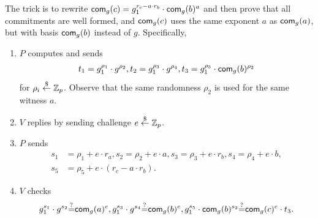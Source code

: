 {\begin{itemize}
  The trick is to rewrite
  $\mathsf{com}_g(c)=g_1^{r_c-a\cdot{}r_b}\cdot\mathsf{com}_g(b)^{a}$ and then prove
  that all commitments are well formed, and $\mathsf{com}_g(c)$ uses the same
  exponent $a$ as $\mathsf{com}_g(a)$, but with basis $\mathsf{com}_g(b)$ instead of
  $g$. Specifically,
  \begin{enumerate}
  \item $P$ computes and sends
    \begin{align*}
      t_1=g_1^{\rho_1}\cdot{}g^{\rho_2},
      t_2=g_1^{\rho_3}\cdot{}g^{\rho_4},
      t_3=g_1^{\rho_5}\cdot{}\mathsf{com}_g(b)^{\rho_2}
      \end{align*}
      for $\rho_i\stackrel{\$}{\leftarrow}\mathbb{Z}_p$. Observe that the same randomness $\rho_2$
      is used for the same witness $a$.
    \item $V$ replies by sending challenge $e\stackrel{\$}{\leftarrow}\mathbb{Z}_p$.
    \item $P$ sends
      \begin{align*}
        s_1&=\rho_1+e\cdot{}r_a,s_2=\rho_2+e\cdot{}a,s_3=\rho_3+e\cdot{}r_b,s_4=\rho_4+e\cdot{}b,\\s_5&=\rho_5+e\cdot{}(r_c-a\cdot{}r_b).
        \end{align*}
    \item $V$ checks
      \begin{align*}
        g_1^{s_1}\cdot{}g^{s_2}{\stackrel{?}{=}}{}\mathsf{com}_g(a)^e, g_1^{s_3}\cdot{}g^{s_4}{\stackrel{?}{=}}{}\mathsf{com}_g(b)^e, g_1^{s_5}\cdot{}\mathsf{com}_g(b)^{s_2}{\stackrel{?}{=}}{}\mathsf{com}_g(c)^e\cdot{}t_3.
        \end{align*}
\end{enumerate}

\end{itemize}
}%




